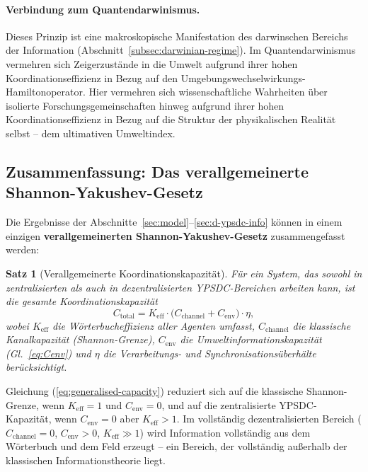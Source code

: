 \documentclass[12pt,a4paper]{article}
\newtheorem{theorem}{Satz}[section]
\theoremstyle{remark}
\begin{document}
	\paragraph{Verbindung zum Quantendarwinismus.}
	Dieses Prinzip ist eine makroskopische Manifestation des darwinschen Bereichs der Information (Abschnitt~\ref{subsec:darwinian-regime}). Im Quantendarwinismus vermehren sich Zeigerzustände in die Umwelt aufgrund ihrer hohen Koordinationseffizienz in Bezug auf den Umgebungswechselwirkungs-Hamiltonoperator. Hier vermehren sich wissenschaftliche Wahrheiten über isolierte Forschungsgemeinschaften hinweg aufgrund ihrer hohen Koordinationseffizienz in Bezug auf die Struktur der physikalischen Realität selbst – dem ultimativen Umweltindex.
	
	\subsection{Zusammenfassung: Das verallgemeinerte Shannon-Yakushev-Gesetz}
	\label{subsec:generalised-law}
	
	Die Ergebnisse der Abschnitte~\ref{sec:model}--\ref{sec:d-ypsdc-info} können in einem einzigen \textbf{verallgemeinerten Shannon-Yakushev-Gesetz} zusammengefasst werden:
	
	\begin{theorem}[Verallgemeinerte Koordinationskapazität]
		Für ein System, das sowohl in zentralisierten als auch in dezentralisierten YPSDC-Bereichen arbeiten kann, ist die gesamte Koordinationskapazität
		\begin{equation}
			\boxed{C_{\mathrm{total}} = K_{\mathrm{eff}} \cdot \bigl(
				C_{\mathrm{channel}} + C_{\mathrm{env}} \bigr) \cdot \eta},
			\label{eq:generalised-capacity}
		\end{equation}
		wobei $K_{\mathrm{eff}}$ die Wörterbucheffizienz aller Agenten umfasst, $C_{\mathrm{channel}}$ die klassische Kanalkapazität (Shannon-Grenze), $C_{\mathrm{env}}$ die Umweltinformationskapazität (Gl.\ \eqref{eq:Cenv}) und $\eta$ die Verarbeitungs- und Synchronisationsüberhälte berücksichtigt.
	\end{theorem}
	
	Gleichung (\ref{eq:generalised-capacity}) reduziert sich auf die klassische Shannon-Grenze, wenn $K_{\mathrm{eff}}=1$ und $C_{\mathrm{env}}=0$, und auf die zentralisierte YPSDC-Kapazität, wenn $C_{\mathrm{env}}=0$ aber $K_{\mathrm{eff}}>1$. Im vollständig dezentralisierten Bereich ($C_{\mathrm{channel}}=0$, $C_{\mathrm{env}}>0$, $K_{\mathrm{eff}}\gg1$) wird Information vollständig aus dem Wörterbuch und dem Feld erzeugt – ein Bereich, der vollständig außerhalb der klassischen Informationstheorie liegt.
	
\end{document}
